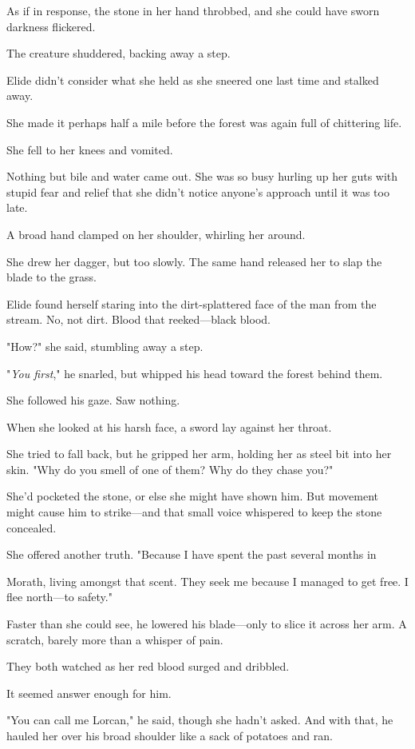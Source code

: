 As if in response, the stone in her hand throbbed, and she could have sworn darkness flickered.

The creature shuddered, backing away a step.

Elide didn't consider what she held as she sneered one last time and stalked away.

She made it perhaps half a mile before the forest was again full of chittering life.

She fell to her knees and vomited.

Nothing but bile and water came out. She was so busy hurling up her guts with stupid fear and relief that she didn't notice anyone's approach until it was too late.

A broad hand clamped on her shoulder, whirling her around.

She drew her dagger, but too slowly. The same hand released her to slap the blade to the grass.

Elide found herself staring into the dirt-splattered face of the man from the stream. No, not dirt. Blood that reeked---black blood.

"How?" she said, stumbling away a step.

"\emph{You first}," he snarled, but whipped his head toward the forest behind them.

She followed his gaze. Saw nothing.

When she looked at his harsh face, a sword lay against her throat.

She tried to fall back, but he gripped her arm, holding her as steel bit into her skin. "Why do you smell of one of them? Why do they chase you?"

She'd pocketed the stone, or else she might have shown him. But movement might cause him to strike---and that small voice whispered to keep the stone concealed.

She offered another truth. "Because I have spent the past several months in

Morath, living amongst that scent. They seek me because I managed to get free. I flee north---to safety."

Faster than she could see, he lowered his blade---only to slice it across her arm. A scratch, barely more than a whisper of pain.

They both watched as her red blood surged and dribbled.

It seemed answer enough for him.

"You can call me Lorcan," he said, though she hadn't asked. And with that, he hauled her over his broad shoulder like a sack of potatoes and ran.

